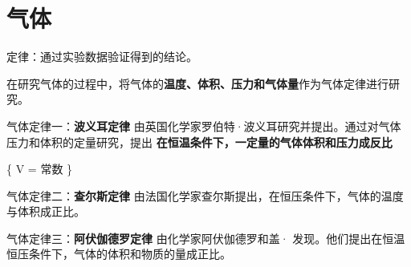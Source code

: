 \section{气体}
定律：通过实验数据验证得到的结论。

在研究气体的过程中，将气体的\textbf{温度、体积、压力和气体量}作为气体定律进行研究。

气体定律一：\textbf{波义耳定律} 由英国化学家罗伯特·波义耳研究并提出。通过对气体压力和体积的定量研究，提出 \textbf{在恒温条件下，一定量的气体体积和压力成反比}

\{ V = 常数 \}

气体定律二：\textbf{查尔斯定律} 由法国化学家查尔斯提出，在恒压条件下，气体的温度与体积成正比。

气体定律三：\textbf{阿伏伽德罗定律} 由化学家阿伏伽德罗和盖· 发现。他们提出在恒温恒压条件下，气体的体积和物质的量成正比。

